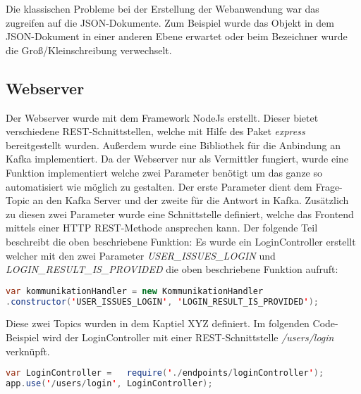
Die klassischen Probleme bei der Erstellung der Webanwendung war das zugreifen auf die JSON-Dokumente. Zum Beispiel wurde das Objekt in dem JSON-Dokument in einer anderen Ebene erwartet oder beim Bezeichner wurde die Groß/Kleinschreibung verwechselt.


\subsection{Webserver}
Der Webserver wurde mit dem Framework NodeJs erstellt. Dieser bietet verschiedene REST-Schnittstellen, welche mit Hilfe des Paket \textit{express} bereitgestellt wurden. Außerdem wurde eine Bibliothek für die Anbindung an Kafka implementiert. Da der Webserver nur als Vermittler fungiert, wurde eine Funktion implementiert welche zwei Parameter benötigt um das ganze so automatisiert wie möglich zu gestalten. Der erste Parameter dient dem Frage-Topic an den Kafka Server und der zweite für die Antwort in Kafka. Zusätzlich zu diesen zwei Parameter wurde eine Schnittstelle definiert, welche das Frontend mittels einer  HTTP REST-Methode ansprechen kann. Der folgende Teil beschreibt die oben beschriebene Funktion: 
Es wurde ein LoginController erstellt welcher mit den zwei Parameter \textit{USER\_ISSUES\_LOGIN} und \textit{LOGIN\_RESULT\_IS\_PROVIDED} die oben beschriebene Funktion aufruft: \\
\begin{lstlisting}[language=Java, basicstyle=\small] 
var kommunikationHandler = new KommunikationHandler
.constructor('USER_ISSUES_LOGIN', 'LOGIN_RESULT_IS_PROVIDED');
\end{lstlisting} 
Diese zwei Topics wurden in dem Kaptiel XYZ definiert. Im folgenden Code-Beispiel wird der LoginController mit einer REST-Schnittstelle \textit{/users/login} verknüpft. \\
\begin{lstlisting}[language=Java, basicstyle=\small] 
var LoginController = 	require('./endpoints/loginController');
app.use('/users/login', LoginController);
\end{lstlisting}

